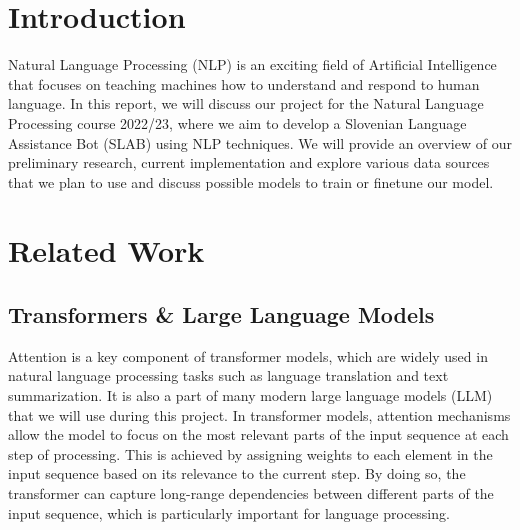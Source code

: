 \documentclass[fleqn,moreauthors,10pt]{ds_report}
\affiliation{\textit{Advisors: doc. dr. Slavko Žitnik}}
\begin{document}
\flushbottom 

\maketitle 

\thispagestyle{empty} 


\section*{Introduction}
	Natural Language Processing (NLP) is an exciting field of Artificial Intelligence that focuses on teaching machines how to understand and respond to human language. 
    In this report, we will discuss our project for the Natural Language Processing course 2022/23, where we aim to develop a Slovenian Language Assistance Bot (SLAB) using NLP techniques.
    We will provide an overview of our preliminary research, current implementation and explore various data sources that we plan to use and discuss possible models to train or finetune our model.

    
\section*{Related Work}

\subsection*{Transformers \& Large Language Models}
Attention \cite{vaswani2017attention} is a key component of transformer models, which are widely used in natural language processing tasks such as language translation and text summarization.
It is also a part of many modern large language models (LLM) that we will use during this project.
In transformer models, attention mechanisms allow the model to focus on the most relevant parts of the input sequence at each step of processing.
This is achieved by assigning weights to each element in the input sequence based on its relevance to the current step.
By doing so, the transformer can capture long-range dependencies between different parts of the input sequence, which is particularly important for language processing.
\end{document}
